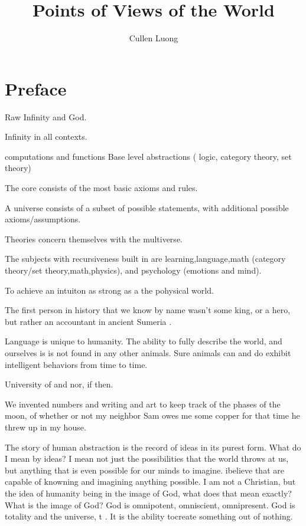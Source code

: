 \documentclass{book}
\begin{document}
\frontmatter
\title{Points of Views of the World}
\author{Cullen Luong}
\maketitle



\let\oldemptyset\emptyset
\let\emptyset\varnothing


\chapter{Preface}


Raw Infinity and God.

Infinity in all contexts.


computations and functions
Base level abstractions ( logic, category theory, set theory)

The core consists of the most basic axioms and rules.

A universe consists of a subset of possible statements, with additional possible axioms/assumptions.

Theories concern themselves with the multiverse.


The subjects with recursiveness built in are learning,language,math (category theory/set theory,math,physics), and psychology (emotions and mind).

To achieve an intuiton as strong as a the pohysical world. 


The first person in history that we know by name wasn't some king, or a hero, but rather an accountant in ancient Sumeria  \autocite[1]{Sumeria:1}. 

Language is unique to humanity. The ability to fully describe the world, and ourselves is is not found in any other animals. Sure animals can and do exhibit intelligent behaviors from time to time. 

University of and nor, if then. 

We invented numbers and writing and art to keep track of the phases of the moon, of whether or not my neighbor Sam owes me some copper for that time he threw up in my house. 

The story of human abstraction is the record of ideas in its purest form. What do I mean by ideas? I mean not just the possibilities that the world throws at us, but anything that is even possible for our minds to imagine.  ibelieve that are capable of knowning and imagining anything possible. I am not a Christian, but the idea of humanity being in the image of God, what does that mean exactly? What is the image of God? God is omnipotent, omniscient, omnipresent. God is totality and the universe, t . It is the ability tocreate something out of nothing. 
\end{document}
